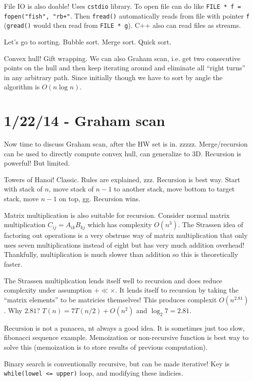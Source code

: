 \documentclass[10pt, twocolumn]{article}
\begin{document}
File IO is also doable! Uses \texttt{cstdio} library. To open file can do like \texttt{FILE * f = fopen("fish", "rb+"}. Then \texttt{fread()} automatically reads from file with pointer \texttt{f} (\texttt{gread()} would then read from \texttt{FILE * g}). C++ also can read files as streams.

Let's go to sorting. Bubble sort. Merge sort. Quick sort. 

Convex hull! Gift wrapping. We can also Graham scan, i.e. get two consecutive points on the hull and then keep iterating around and eliminate all ``right turns'' in any arbitrary path. Since initially though we have to sort by angle the algorithm is $O(n\log n)$. 

\section{1/22/14 - Graham scan}

Now time to discuss Graham scan, after the HW set is in. zzzzz. Merge/recursion can be used to directly compute convex hull, can generalize to 3D. Recursion is powerful! But limited. 

Towers of Hanoi! Classic. Rules are explained, zzz. Recursion is best way. Start with stack of $n$, move stack of $n-1$ to another stack, move bottom to target stack, move $n-1$ on top, gg. Recursion wins. 

Matrix multiplication is also suitable for recursion. Consider normal matrix multiplication $C_{ij} = A_{ik}B_{kj}$ which has complexity $O(n^3)$. The Strassen idea of factoring out operations is a very obstruse way of matrix multiplication that only uses seven multiplications instead of eight but has very much addition overhead! Thankfully, multiplication is much slower than addition so this is theoretically faster. 

The Strassen multiplication lends itself well to recursion and does reduce complexity under assumption $+ \ll \times$. It lends itself to recursion by taking the ``matrix elements'' to be matricies themselves! This produces complexit $O(n^{2.81})$. Why $2.81$? $T(n) = 7T(n/2) + O(n^2)$ and $\log_2 7 = 2.81$.

Recursion is not a panacea, nt always a good idea. It is sometimes just too slow, fibonacci sequence example. Memoization or non-recursive function is best way to solve this (memoization is to store results of previous computation).

Binary search is conventionally recursive, but can be made iterative! Key is \texttt{while(lowel <= upper)} loop, and modifying these indicies.
\end{document}
